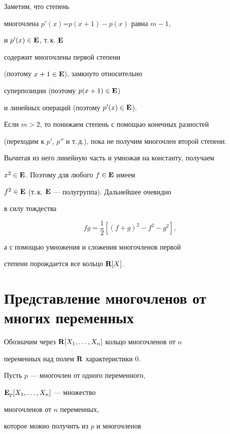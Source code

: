 \begin{pf} Заметим, что степень


многочлена $p'(x)$=$p(x+1)- p(x)$ равна $m-1$,


и $p'(x) \in {\bold E}$, т.\,к. ${\bold E}$


содержит многочлены первой степени


(поэтому $ x+1 \in {\bold E}$), замкнуто относительно


суперпозиции (поэтому $ p(x+1) \in {\bold E}$)


и линейных операций (поэтому $p'(x) \in {\bold E}$).


Если $m>2$, то понижаем степень с помощью конечных разностей


(переходим к $p'$, $p''$ и т.\,д.), пока не получим многочлен второй степени.


Вычитая из него линейную часть и умножая на константу, получаем


$x^2 \in {\bold E}$. Поэтому для любого $f\in {\bold E}$ имеем


$f^{2}\in {\bold E}$ (т.\,к. $\bold E$ --- полугруппа). Дальнейшее очевидно


в силу тождества


$$


fg =\frac{1}{2}[(f+g)^{2}-f^{2}-g^{2}],


$$


а с помощью умножения и сложения многочленов первой


степени порождается все кольцо ${\bold R}[X]$.


\end{pf}





\section{Представление многочленов от многих переменных}





Обозначим через ${\bold R}[X_1,\dotsc,X_n]$ кольцо многочленов от $n$


переменных над полем ${\bold R}$ характеристики 0.


Пусть $p$ --- многочлен от одного переменного,


${\bold E}_p[X_1,\dotsc,X_n]$ --- множество


многочленов от $n$ переменных,


которое можно получить из $p$ и многочленов



